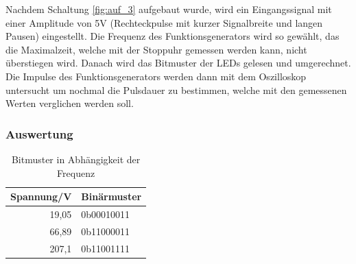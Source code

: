 \documentclass[12pt,a4paper]{article}
\begin{document}
Nachdem Schaltung \ref{fig:auf_3} aufgebaut wurde, wird ein Eingangssignal mit einer Amplitude von 5V (Rechteckpulse mit kurzer Signalbreite und langen Pausen) eingestellt. Die Frequenz des Funktionsgenerators wird so gewählt, das die Maximalzeit, welche mit der Stoppuhr gemessen werden kann, nicht überstiegen wird. Danach wird das Bitmuster der LEDs gelesen und umgerechnet. Die Impulse des Funktionsgenerators werden dann mit dem Oszilloskop untersucht um nochmal die Pulsdauer zu bestimmen, welche mit den gemessenen Werten verglichen werden soll.

\subsubsection*{Auswertung}

\begin{table}[htbp]
\begin{center}
\begin{tabular}{|r|l|}
\hline
\multicolumn{1}{|l|}{Spannung/V} & Binärmuster \\ \hline \hline
19,05 & 0b00010011 \\ \hline
66,89 & 0b11000011 \\ \hline
207,1 & 0b11001111 \\ \hline
\end{tabular}
\end{center}
\caption{Bitmuster in Abhängigkeit der Frequenz}
\label{tab:span}
\end{table}
\end{document}
